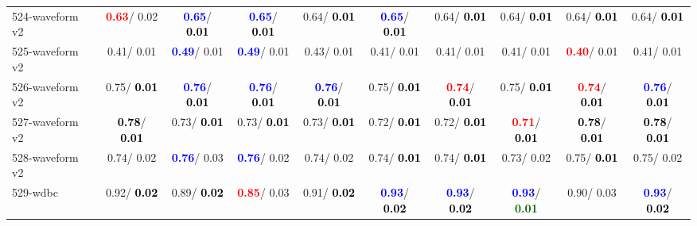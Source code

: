 \begin{table}[h]
\begin{center}
{\begin{tabular}{lc|c|c|c|c|c|c|c|c}
524-waveform v2 & \textcolor{red}{\textbf{  0.63}}/  0.02 & \textcolor{blue}{\textbf{  0.65}}/\textcolor{black}{\textbf{  0.01}} & \textcolor{blue}{\textbf{  0.65}}/\textcolor{black}{\textbf{  0.01}} &   0.64/\textcolor{black}{\textbf{  0.01}} & \textcolor{blue}{\textbf{  0.65}}/\textcolor{black}{\textbf{  0.01}} &   0.64/\textcolor{black}{\textbf{  0.01}} &   0.64/\textcolor{black}{\textbf{  0.01}} &   0.64/\textcolor{black}{\textbf{  0.01}} &   0.64/\textcolor{black}{\textbf{  0.01}} \\
525-waveform v2 &   0.41/  0.01 & \textcolor{blue}{\textbf{  0.49}}/  0.01 & \textcolor{blue}{\textbf{  0.49}}/  0.01 &   0.43/  0.01 &   0.41/  0.01 &   0.41/  0.01 &   0.41/  0.01 & \textcolor{red}{\textbf{  0.40}}/  0.01 &   0.41/  0.01 \\
526-waveform v2 &   0.75/\textcolor{black}{\textbf{  0.01}} & \textcolor{blue}{\textbf{  0.76}}/\textcolor{black}{\textbf{  0.01}} & \textcolor{blue}{\textbf{  0.76}}/\textcolor{black}{\textbf{  0.01}} & \textcolor{blue}{\textbf{  0.76}}/\textcolor{black}{\textbf{  0.01}} &   0.75/\textcolor{black}{\textbf{  0.01}} & \textcolor{red}{\textbf{  0.74}}/\textcolor{black}{\textbf{  0.01}} &   0.75/\textcolor{black}{\textbf{  0.01}} & \textcolor{red}{\textbf{  0.74}}/\textcolor{black}{\textbf{  0.01}} & \textcolor{blue}{\textbf{  0.76}}/\textcolor{black}{\textbf{  0.01}} \\ \hline
527-waveform v2 & \textcolor{black}{\textbf{  0.78}}/\textcolor{black}{\textbf{  0.01}} &   0.73/\textcolor{black}{\textbf{  0.01}} &   0.73/\textcolor{black}{\textbf{  0.01}} &   0.73/\textcolor{black}{\textbf{  0.01}} &   0.72/\textcolor{black}{\textbf{  0.01}} &   0.72/\textcolor{black}{\textbf{  0.01}} & \textcolor{red}{\textbf{  0.71}}/\textcolor{black}{\textbf{  0.01}} & \textcolor{black}{\textbf{  0.78}}/\textcolor{black}{\textbf{  0.01}} & \textcolor{black}{\textbf{  0.78}}/\textcolor{black}{\textbf{  0.01}} \\
528-waveform v2 &   0.74/  0.02 & \textcolor{blue}{\textbf{  0.76}}/  0.03 & \textcolor{blue}{\textbf{  0.76}}/  0.02 &   0.74/  0.02 &   0.74/\textcolor{black}{\textbf{  0.01}} &   0.74/\textcolor{black}{\textbf{  0.01}} &   0.73/  0.02 &   0.75/\textcolor{black}{\textbf{  0.01}} &   0.75/  0.02 \\
529-wdbc &   0.92/\textcolor{black}{\textbf{  0.02}} &   0.89/\textcolor{black}{\textbf{  0.02}} & \textcolor{red}{\textbf{  0.85}}/  0.03 &   0.91/\textcolor{black}{\textbf{  0.02}} & \textcolor{blue}{\textbf{  0.93}}/\textcolor{black}{\textbf{  0.02}} & \textcolor{blue}{\textbf{  0.93}}/\textcolor{black}{\textbf{  0.02}} & \textcolor{blue}{\textbf{  0.93}}/\textcolor{darkgreen}{\textbf{  0.01}} &   0.90/  0.03 & \textcolor{blue}{\textbf{  0.93}}/\textcolor{black}{\textbf{  0.02}} \\

\end{tabular}}
\end{center}
\end{table}
